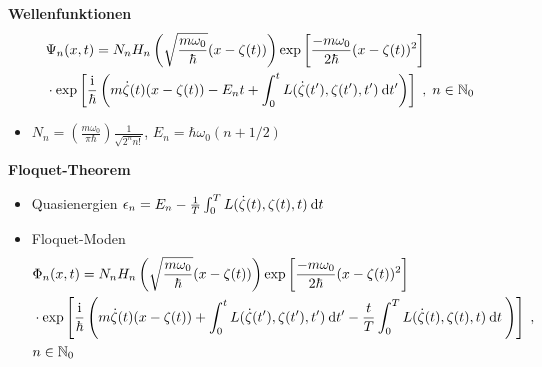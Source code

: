 \begin{frame}
  \textbf{Wellenfunktionen}
  \begin{align}
    &\Psi_n(x,t) = N_nH_n\left(\sqrt{\frac{m\omega_0}{\hbar}}(x-\zeta(t))\right) \exp\left[\frac{-m\omega_0}{2\hbar}(x-\zeta(t))^2\right] \notag\\
    & \cdot \exp\left[\frac{\text i}{\hbar}\left(m\dot \zeta(t)(x-\zeta(t))-E_nt+\int_0^tL(\dot \zeta(t'),\zeta(t'),t')\:\text dt'\right)\right] \; ,
    \; n \in \mathbb{N}_0
  \end{align}
  \begin{itemize}
    \item $N_n = \left(\frac{m\omega_0}{\pi \hbar}\right) \frac{1}{\sqrt{2^nn!}}$,
     $E_n = \hbar \omega_0(n+1/2)$ %
  \end{itemize}

  \textbf{Floquet-Theorem}
  \begin{itemize}
    \item Quasienergien $\epsilon_n = E_n - \frac{1}{T} \int_0^T L(\dot \zeta(t), \zeta(t), t) \: \text d t$
    \item Floquet-Moden
    \begin{align}
        &\Phi_n(x,t) =
         N_nH_n\left(\sqrt{\frac{m\omega_0}{\hbar}}(x-\zeta(t))\right) \exp\left[\frac{-m\omega_0}{2\hbar}(x-\zeta(t))^2\right] \notag\\
        & \cdot \exp\left[\frac{\text i}{\hbar}\left(m\dot \zeta(t)(x-\zeta(t))+\int_0^tL(\dot \zeta(t'),\zeta(t'),t')\:\text d t'-\frac{t}{T} \int_0^T L(\dot \zeta(t),\zeta(t),t)\:\text dt\: \right)\right] \; ,\notag\\
        & n \in \mathbb{N}_0
    \end{align}
  \end{itemize}
\end{frame}


